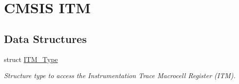 \hypertarget{group___c_m_s_i_s___i_t_m}{\section{C\-M\-S\-I\-S I\-T\-M}
\label{group___c_m_s_i_s___i_t_m}
}
\subsection*{Data Structures}
\begin{DoxyCompactItemize}
\item 
struct \hyperlink{struct_i_t_m___type}{I\-T\-M\-\_\-\-Type}
\begin{DoxyCompactList}\small\item\em Structure type to access the Instrumentation Trace Macrocell Register (I\-T\-M). \end{DoxyCompactList}\end{DoxyCompactItemize}

